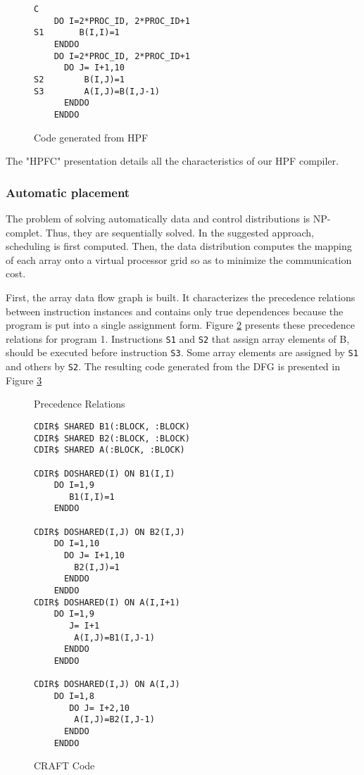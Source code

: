 \begin{figure}[htp]
\begin{verbatim}
C
    DO I=2*PROC_ID, 2*PROC_ID+1
S1       B(I,I)=1
    ENDDO
    DO I=2*PROC_ID, 2*PROC_ID+1
      DO J= I+1,10
S2        B(I,J)=1
S3        A(I,J)=B(I,J-1)
      ENDDO
    ENDDO  
\end{verbatim}
\caption{Code generated from HPF}
\label{hpfcc}
\end{figure}

The "HPFC" presentation details all the characteristics of our HPF compiler.

\subsubsection{Automatic placement}

The problem of solving automatically data and control distributions is
NP-complet. Thus, they are sequentially solved. In the suggested approach,
scheduling is first computed. Then, the data distribution computes the mapping
of each array onto a virtual processor grid so as to minimize 
the communication cost.

First, the array data flow graph is built. It characterizes the 
 precedence relations between instruction instances and contains only true 
dependences because the program is put into a single assignment form. 
 Figure \ref{plac} presents these precedence relations for program 1. 
Instructions \verb+S1+ and \verb+S2+ that assign array elements of B, should 
be executed before instruction \verb+S3+. Some array elements are assigned
by \verb+S1+ and others by \verb+S2+. The resulting code generated from the 
DFG is presented in Figure \ref{plac2}

\begin{figure}[htp]
\caption{Precedence Relations}
\label{plac}
\end{figure}

\begin{figure}[htp]
\begin{verbatim}
CDIR$ SHARED B1(:BLOCK, :BLOCK)
CDIR$ SHARED B2(:BLOCK, :BLOCK)
CDIR$ SHARED A(:BLOCK, :BLOCK)

CDIR$ DOSHARED(I) ON B1(I,I)
    DO I=1,9
       B1(I,I)=1
    ENDDO

CDIR$ DOSHARED(I,J) ON B2(I,J)
    DO I=1,10
      DO J= I+1,10
        B2(I,J)=1
      ENDDO
    ENDDO  
CDIR$ DOSHARED(I) ON A(I,I+1)
    DO I=1,9
       J= I+1
        A(I,J)=B1(I,J-1)
      ENDDO
    ENDDO  

CDIR$ DOSHARED(I,J) ON A(I,J)
    DO I=1,8
       DO J= I+2,10
        A(I,J)=B2(I,J-1)
      ENDDO
    ENDDO  
\end{verbatim}
\caption{CRAFT Code}
\label{plac2}
\end{figure}


